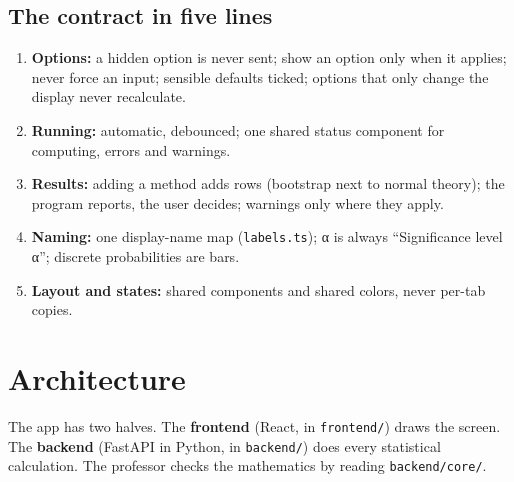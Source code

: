 \documentclass[11pt,a4paper]{article}
\newcommand{\f}[1]{\texttt{#1}}
\begin{document}
\subsection*{The contract in five lines}
\begin{enumerate}
\item \textbf{Options:} a hidden option is never sent; show an option only when it applies; never force an
  input; sensible defaults ticked; options that only change the display never recalculate.
\item \textbf{Running:} automatic, debounced; one shared status component for computing, errors and warnings.
\item \textbf{Results:} adding a method adds rows (bootstrap next to normal theory); the program reports, the
  user decides; warnings only where they apply.
\item \textbf{Naming:} one display-name map (\f{labels.ts}); α is always ``Significance level α''; discrete
  probabilities are bars.
\item \textbf{Layout and states:} shared components and shared colors, never per-tab copies.
\end{enumerate}


\newpage
\section{Architecture}

The app has two halves. The \textbf{frontend} (React, in \f{frontend/}) draws the screen. The \textbf{backend}
(FastAPI in Python, in \f{backend/}) does every statistical calculation. The professor checks the mathematics
by reading \f{backend/core/}.
\end{document}
